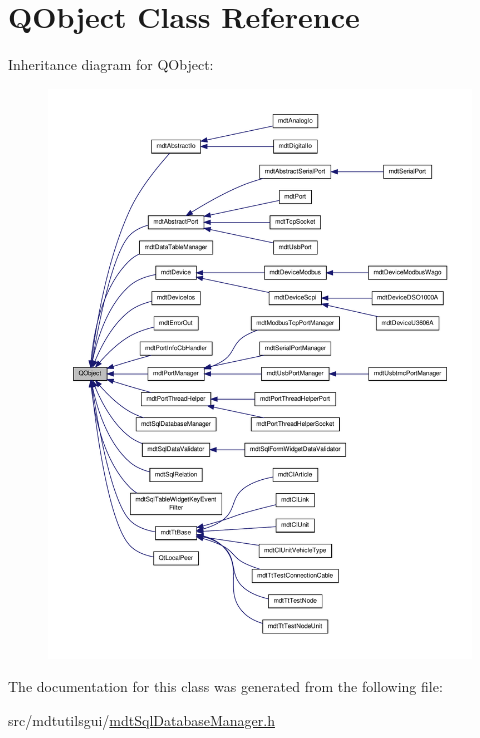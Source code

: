 \hypertarget{class_q_object}{\section{Q\-Object Class Reference}
\label{class_q_object}
}


Inheritance diagram for Q\-Object\-:
\nopagebreak
\begin{figure}[H]
\begin{center}
\leavevmode
\includegraphics[width=350pt]{class_q_object__inherit__graph}
\end{center}
\end{figure}


The documentation for this class was generated from the following file\-:\begin{DoxyCompactItemize}
\item 
src/mdtutilsgui/\hyperlink{mdt_sql_database_manager_8h}{mdt\-Sql\-Database\-Manager.\-h}\end{DoxyCompactItemize}
